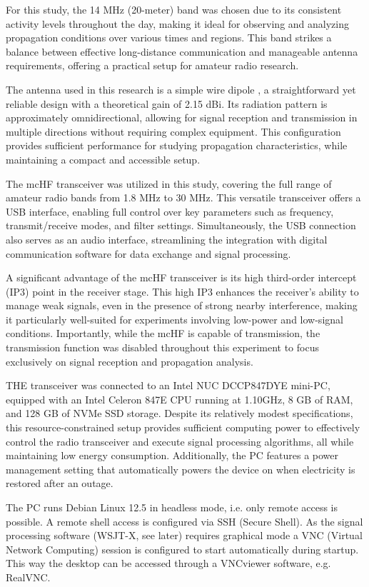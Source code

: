 \documentclass[conference]{IEEEtran}
\begin{document}
For this study, the 14 MHz (20-meter) band was chosen due to its consistent
activity levels throughout the day, making it ideal for observing and analyzing
propagation conditions over various times and regions. This band strikes a
balance between effective long-distance communication and manageable antenna
requirements, offering a practical setup for amateur radio research.

The antenna used in this research is a simple wire dipole \cite{straw2003}, a straightforward
yet reliable design with a theoretical gain of 2.15 dBi. Its radiation pattern
is approximately omnidirectional, allowing for signal reception and
transmission in multiple directions without requiring complex equipment. This
configuration provides sufficient performance for studying propagation
characteristics, while maintaining a compact and accessible setup.

The mcHF transceiver was utilized in this study, covering the full range of
amateur radio bands from 1.8 MHz to 30 MHz. This versatile transceiver offers a
USB interface, enabling full control over key parameters such as frequency,
transmit/receive modes, and filter settings. Simultaneously, the USB connection
also serves as an audio interface, streamlining the integration with digital
communication software for data exchange and signal processing.

A significant advantage of the mcHF transceiver is its high third-order
intercept (IP3) point in the receiver stage. This high IP3 enhances the
receiver’s ability to manage weak signals, even in the presence of strong
nearby interference, making it particularly well-suited for experiments
involving low-power and low-signal conditions. Importantly, while the mcHF is
capable of transmission, the transmission function was disabled throughout this
experiment to focus exclusively on signal reception and propagation analysis.

THE transceiver was connected to an Intel NUC DCCP847DYE mini-PC, equipped with
an Intel Celeron 847E CPU running at 1.10GHz, 8 GB of RAM, and 128 GB of NVMe
SSD storage. Despite its relatively modest specifications, this
resource-constrained setup provides sufficient computing power to effectively
control the radio transceiver and execute signal processing algorithms, all
while maintaining low energy consumption. Additionally, the PC features a power
management setting that automatically powers the device on when electricity is
restored after an outage.

The PC runs Debian Linux 12.5 in headless mode, i.e. only remote access is
possible. A remote shell access is configured via SSH (Secure Shell).
As the signal processing
software (WSJT-X, see later) requires graphical mode a VNC (Virtual Network Computing)
\cite{richardson1998}
session is configured
to start automatically during startup. This way the desktop can be accessed
through a VNCviewer software, e.g. RealVNC. 
\end{document}
